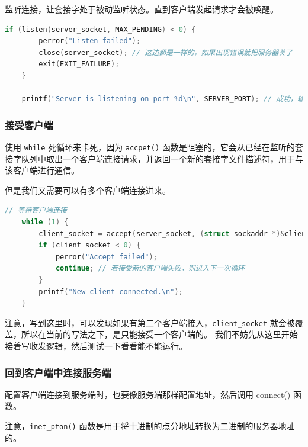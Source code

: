 \documentclass[14pt,a4paper,UTF8,twoside]{article}
\begin{document}
监听连接，让套接字处于被动监听状态。直到客户端发起请求才会被唤醒。

\begin{lstlisting}[language=C]
    if (listen(server_socket, MAX_PENDING) < 0) {
        perror("Listen failed");
        close(server_socket); // 这边都是一样的，如果出现错误就把服务器关了
        exit(EXIT_FAILURE);
    }

    printf("Server is listening on port %d\n", SERVER_PORT); // 成功，输出提示信息
\end{lstlisting}

\subsubsection*{接受客户端}

使用 \texttt{while} 死循环来卡死，因为 \texttt{accpet()} 函数是阻塞的，它会从已经在监听的套接字队列中取出一个客户端连接请求，并返回一个新的套接字文件描述符，用于与该客户端进行通信。

但是我们又需要可以有多个客户端连接进来。

\begin{lstlisting}[language=C, title={Accept Client}]
    // 等待客户端连接
    while (1) {
        client_socket = accept(server_socket, (struct sockaddr *)&client_addr, &client_addr_len);
        if (client_socket < 0) {
            perror("Accept failed");
            continue; // 若接受新的客户端失败，则进入下一次循环
        }
        printf("New client connected.\n");
    }
\end{lstlisting}

注意，写到这里时，可以发现如果有第二个客户端接入，\texttt{client\_socket} 就会被覆盖，所以在当前的写法之下，是只能接受一个客户端的。
我们不妨先从这里开始接着写收发逻辑，然后测试一下看看能不能运行。

\subsubsection*{回到客户端中连接服务端}

配置客户端连接到服务端时，也要像服务端那样配置地址，然后调用 connect() 函数。

注意，\texttt{inet\_pton()} 函数是用于将十进制的点分地址转换为二进制的服务器地址的。
\end{document}
